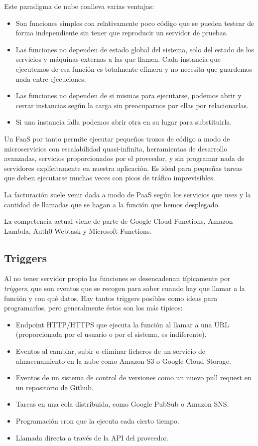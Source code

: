 Este paradigma de nube conlleva varias ventajas:
\begin{itemize}
    \item Son funciones simples con relativamente poco código que se pueden testear de forma independiente sin tener que reproducir un servidor de pruebas.
    \item Las funciones no dependen de estado global del sistema, solo del estado de los servicios y máquinas externas a las que llamen. Cada instancia que ejecutemos de esa función es totalmente efímera y no necesita que guardemos nada entre ejecuciones.
    \item Las funciones no dependen de si mismas para ejecutarse, podemos abrir y cerrar instancias según la carga sin preocuparnos por ellas por relacionarlas.
    \item Si una instancia falla podemos abrir otra en su lugar para substituirla.
\end{itemize}

Un FaaS por tanto permite ejecutar pequeños trozos de código a modo de microservicios con escalabilidad quasi-infinita, herramientas de desarrollo avanzadas, servicios proporcionados por el proveedor, y sin programar nada de servidores explícitamente en nuestra aplicación. Es ideal para pequeñas tareas que deben ejecutarse muchas veces con picos de tráfico imprevisibles.

La facturación suele venir dada a modo de PaaS según los servicios que uses y la cantidad de llamadas que se hagan a la función que hemos desplegado.

La competencia actual viene de parte de Google Cloud Functions, Amazon Lambda, Auth0 Webtask y Microsoft Functions.

\subsection{Triggers}

Al no tener servidor propio las funciones se desencadenan típicamente por \emph{triggers}, que son eventos que se recogen para saber cuando hay que llamar a la función y con qué datos. Hay tantos triggers posibles como ideas para programarlos, pero generalmente éstos son los más típicos:
\begin{itemize}
    \item Endpoint HTTP/HTTPS que ejecuta la función al llamar a una URL (proporcionada por el usuario o por el sistema, es indiferente).
    \item Eventos al cambiar, subir o eliminar ficheros de un servicio de almacenamiento en la nube como Amazon S3 o Google Cloud Storage.
    \item Eventos de un sistema de control de versiones como un nuevo pull request en un repositorio de Github.
    \item Tareas en una cola distribuida, como Google PubSub o Amazon SNS.
    \item Programación cron que la ejecuta cada cierto tiempo.
    \item Llamada directa a través de la API del proveedor.
\end{itemize}

